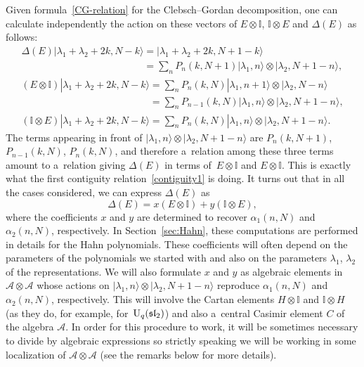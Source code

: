 \documentclass[pdftex]{sigma}
\numberwithin{equation}{section}
\theoremstyle{definition}
\begin{document}
Given formula~\eqref{CG-relation} for the Clebsch--Gordan decomposition, one can calculate independently the action on these vectors of $E\otimes \mathbb{I}$, $\mathbb{I}\otimes E$ and $\Delta(E)$ as follows:
\begin{gather*}
\Delta(E)|\lambda_1+\lambda_2+2k,N-k\rangle = |\lambda_1+\lambda_2+2k,N+1-k\rangle\\
 \phantom{\Delta(E)|\lambda_1+\lambda_2+2k,N-k\rangle }{}= \sum_{n} P_n(k,N+1)|\lambda_1,n\rangle\otimes |\lambda_2,N+1-n\rangle,\\
(E\otimes \mathbb{I})|\lambda_1+\lambda_2+2k,N-k\rangle = \sum_{n} P_n(k,N)|\lambda_1,n+1\rangle\otimes |\lambda_2,N-n\rangle\\
 \phantom{(E\otimes \mathbb{I})|\lambda_1+\lambda_2+2k,N-k\rangle}{} = \sum_{n} P_{n-1}(k,N)|\lambda_1,n\rangle\otimes |\lambda_2,N+1-n\rangle,\\
(\mathbb{I}\otimes E)|\lambda_1+\lambda_2+2k,N-k\rangle = \sum_{n} P_n(k,N)|\lambda_1,n\rangle\otimes |\lambda_2,N+1-n\rangle.
\end{gather*}
The terms appearing in front of $|\lambda_1,n\rangle\otimes |\lambda_2,N+1-n\rangle$ are
$P_n(k,N+1)$, $ P_{n-1}(k,N)$, $ P_n(k,N)$,
and therefore a~relation among these three terms amount to a~relation giving $\Delta(E)$ in terms of~${E\otimes \mathbb{I}}$ and $E\otimes \mathbb{I}$. This is exactly what the first contiguity relation~\eqref{contiguity1} is doing. It turns out that in all the cases considered, we can express $\Delta(E)$ as
\[\Delta(E)=x(E\otimes \mathbb{I})+y(\mathbb{I}\otimes E),\]
where the coefficients $x$ and $y$ are determined to recover $\alpha_1(n,N)$ and $\alpha_2(n,N)$, respectively.
In Section~\ref{sec:Hahn}, these computations are performed in details for the Hahn polynomials.
These coefficients will often depend on the parameters of the polynomials we started with and also on the parameters $\lambda_1$, $\lambda_2$ of the representations. We will also formulate $x$ and $y$ as algebraic elements in $\mathcal{A}\otimes \mathcal{A}$ whose actions on $|\lambda_1,n\rangle\otimes |\lambda_2,N+1-n\rangle$ reproduce $\alpha_1(n,N)$ and $\alpha_2(n,N)$, respectively. This will involve the Cartan elements $H\otimes \mathbb{I}$ and $\mathbb{I}\otimes H$ (as they do, for example, for~${\rm U}_q(\mathfrak{sl}_2)$) and also a~central Casimir element $C$ of the algebra $\mathcal{A}$. In order for this procedure to work, it will be sometimes necessary to divide by algebraic expressions so strictly speaking we will be working in some localization of $\mathcal{A}\otimes \mathcal{A}$ (see the remarks below for more details).
\end{document}
